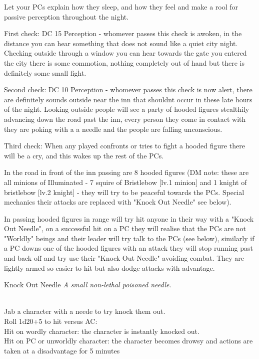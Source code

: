 \documentclass[10pt,twoside,twocolumn]{article}
\begin{document}
Let your PCs explain how they sleep, and how they feel and make a rool for passive perception throughout the night.

First check: DC 15 Perception - whomever passes this check is awoken, in the distance you can hear something that does not sound like a quiet city night. Checking outside through a window you can hear towards the gate you entered the city there is some commotion, nothing completely out of hand but there is definitely some small fight.

Second check: DC 10 Perception - whomever passes this check is now alert, there are definitely sounds outside near the inn that shouldnt occur in these late hours of the night. Looking outside people will see a party of hooded figures stealthily advancing down the road past the inn, every person they come in contact with they are poking with a a needle and the people are falling unconscious.

Third check: When any played confronts or tries to fight a hooded figure there will be a cry, and this wakes up the rest of the PCs.

In the road in front of the inn passing are 8 hooded figures (DM note: these are all minions of Illuminated - 7 squire of Bristlebow [lv.1 minion] and 1 knight of bristlebow [lv.2 knight] - they will try to be peaceful towards the PCs. Special mechanics their attacks are replaced with "Knock Out Needle" see below).

In passing hooded figures in range will try hit anyone in their way with a "Knock Out Needle", on a successful hit on a PC they will realise that the PCs are not "Worldly" beings and their leader will try talk to the PCs (see below), similarly if a PC downs one of the hooded figures with an attack they will stop running past and back off and try use their "Knock Out Needle" avoiding combat. They are lightly armed so easier to hit but also dodge attacks with advantage.

\begin{itembox}{Knock Out Needle}
	\textit{A small non-lethal poisoned needle.}\\
	\hline \\[1mm]
	\begin{itemaction}
		Jab a character with a neede to try knock them out.\\
		Roll 1d20+5 to hit versus AC:\\
		Hit on wordly character: the character is instantly knocked out.\\
		Hit on PC or unworldly character: the character becomes drowsy and actions are taken at a disadvantage for 5 minutes
	\end{itemaction}
\end{itembox}
\end{document}
